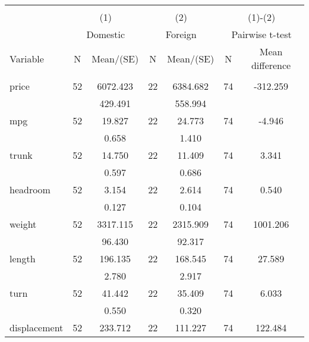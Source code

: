 
\begin{tabular}{@{\extracolsep{5pt}}lcccccc}
\\[-1.8ex]\hline \hline \\[-1.8ex]
 & \multicolumn{2}{c}{(1)}  & \multicolumn{2}{c}{(2)}  & \multicolumn{2}{c}{(1)-(2)} \\
 & \multicolumn{2}{c}{Domestic}  & \multicolumn{2}{c}{Foreign}  & \multicolumn{2}{c}{Pairwise t-test}  \\
Variable & N & Mean/(SE) & N & Mean/(SE) & N & Mean difference \\ \hline \\[-1.8ex] 
price   & 52    &  6072.423    & 22    &  6384.682    & 74    &  -312.259   \\
 &   &   429.491  &   &   558.994  &   &   \\
mpg   & 52    &    19.827    & 22    &    24.773    & 74    &    -4.946   \\
 &   &     0.658  &   &     1.410  &   &   \\
trunk   & 52    &    14.750    & 22    &    11.409    & 74    &     3.341   \\
 &   &     0.597  &   &     0.686  &   &   \\
headroom   & 52    &     3.154    & 22    &     2.614    & 74    &     0.540   \\
 &   &     0.127  &   &     0.104  &   &   \\
weight   & 52    &  3317.115    & 22    &  2315.909    & 74    &  1001.206   \\
 &   &    96.430  &   &    92.317  &   &   \\
length   & 52    &   196.135    & 22    &   168.545    & 74    &    27.589   \\
 &   &     2.780  &   &     2.917  &   &   \\
turn   & 52    &    41.442    & 22    &    35.409    & 74    &     6.033   \\
 &   &     0.550  &   &     0.320  &   &   \\
displacement   & 52    &   233.712    & 22    &   111.227    & 74    &   122.484   \\

\end{tabular}
